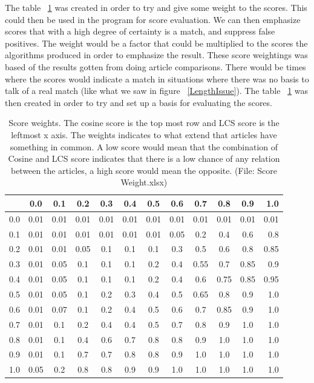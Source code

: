 The table ~\ref{ScoreWeights} was created in order to try and give some weight to the scores. This could then be used in the program for score evaluation. We can then emphasize scores that with a high degree of certainty is a match, and suppress false positives. The weight would be a factor that could be multiplied to the scores the algorithms produced in order to emphasize the result. These score weightings was based of the results gotten from doing article comparisons. There would be times where the scores would indicate a match in situations where there was no basis to talk of a real match (like what we saw in figure ~\ref{LengthIssue}). The table ~\ref{ScoreWeights} was then created in order to try and set up a basis for evaluating the scores. 

\begin{table}
\begin{center}
	\begin{tabular}{l | c | c | c | c | c | c | c | c | c | c | r}
		    & 0.0 & 0.1 & 0.2 & 0.3 & 0.4 & 0.5 & 0.6 & 0.7 & 0.8 & 0.9 & 1.0\\ \hline
		0.0 & 0.01 & 0.01 & 0.01 & 0.01 & 0.01 & 0.01 & 0.01 & 0.01 & 0.01 & 0.01 & 0.01\\ \hline
		0.1 & 0.01 & 0.01 & 0.01 & 0.01 & 0.01 & 0.01 & 0.05 & 0.2 & 0.4 & 0.6 & 0.8\\ \hline
		0.2 & 0.01 & 0.01 & 0.05 & 0.1 & 0.1 & 0.1 & 0.3 & 0.5 & 0.6 & 0.8 & 0.85\\ \hline
		0.3 & 0.01 & 0.05 & 0.1 & 0.1 & 0.1 & 0.2 & 0.4 & 0.55 & 0.7 & 0.85 & 0.9\\ \hline
		0.4 & 0.01 & 0.05 & 0.1 & 0.1 & 0.1 & 0.2 & 0.4 & 0.6 & 0.75 & 0.85 & 0.95\\ \hline
		0.5 & 0.01 & 0.05 & 0.1 & 0.2 & 0.3 & 0.4 & 0.5 & 0.65 & 0.8 & 0.9 & 1.0\\ \hline
		0.6 & 0.01 & 0.07 & 0.1 & 0.2 & 0.4 & 0.5 & 0.6 & 0.7 & 0.85 & 0.9 & 1.0\\ \hline
		0.7 & 0.01 & 0.1 & 0.2 & 0.4 & 0.4 & 0.5 & 0.7 & 0.8 & 0.9 & 1.0 & 1.0\\ \hline
		0.8 & 0.01 & 0.1 & 0.4 & 0.6 & 0.7 & 0.8 & 0.8 & 0.9 & 1.0 & 1.0 & 1.0\\ \hline
		0.9 & 0.01 & 0.1 & 0.7 & 0.7 & 0.8 & 0.8 & 0.9 & 1.0 & 1.0 & 1.0 & 1.0\\ \hline
		1.0 & 0.05 & 0.2 & 0.8 & 0.8 & 0.9 & 0.9 & 1.0 & 1.0 & 1.0 & 1.0 & 1.0\\ \hline
	\end{tabular}
\end{center}
\caption{Score weights. The cosine score is the top most row and LCS score is the leftmost x axis. The weights indicates to what extend that articles have something in common. A low score would mean that the combination of Cosine and LCS score indicates that there is a low chance of any relation between the articles, a high score would mean the opposite. (File: Score Weight.xlsx)} \label{ScoreWeights}
\end{table}


